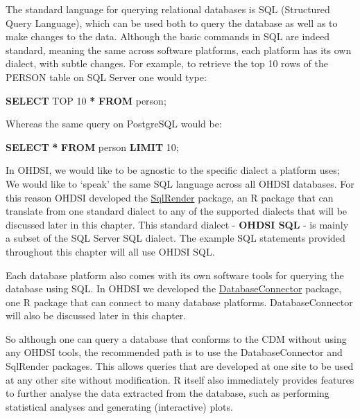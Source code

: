 \documentclass[11pt]{book}
\newenvironment{Shaded}{\begin{snugshade}}{\end{snugshade}}
\newcommand{\DecValTok}[1]{\textcolor[rgb]{0.00,0.00,0.81}{#1}}
\newcommand{\KeywordTok}[1]{\textcolor[rgb]{0.13,0.29,0.53}{\textbf{#1}}}
\newcommand{\NormalTok}[1]{#1}
\newcommand{\OperatorTok}[1]{\textcolor[rgb]{0.81,0.36,0.00}{\textbf{#1}}}
\theoremstyle{definition}
\theoremstyle{definition}
\theoremstyle{definition}
\theoremstyle{remark}
\begin{document}
The standard language for querying relational databases is SQL (Structured Query Language), which can be used both to query the database as well as to make changes to the data. Although the basic commands in SQL are indeed standard, meaning the same across software platforms, each platform has its own dialect, with subtle changes. For example, to retrieve the top 10 rows of the PERSON table on SQL Server one would type:

\begin{Shaded}
\begin{Highlighting}[]
\KeywordTok{SELECT}\NormalTok{ TOP }\DecValTok{10} \OperatorTok{*} \KeywordTok{FROM}\NormalTok{ person;}
\end{Highlighting}
\end{Shaded}

Whereas the same query on PostgreSQL would be:

\begin{Shaded}
\begin{Highlighting}[]
\KeywordTok{SELECT} \OperatorTok{*} \KeywordTok{FROM}\NormalTok{ person }\KeywordTok{LIMIT} \DecValTok{10}\NormalTok{;}
\end{Highlighting}
\end{Shaded}

In OHDSI, we would like to be agnostic to the specific dialect a platform uses; We would like to `speak' the same SQL language across all OHDSI databases. For this reason OHDSI developed the \href{https://ohdsi.github.io/SqlRender/}{SqlRender} package, an R package that can translate from one standard dialect to any of the supported dialects that will be discussed later in this chapter. This standard dialect - \textbf{OHDSI SQL} - is mainly a subset of the SQL Server SQL dialect. The example SQL statements provided throughout this chapter will all use OHDSI SQL.

Each database platform also comes with its own software tools for querying the database using SQL. In OHDSI we developed the \href{https://ohdsi.github.io/DatabaseConnector/}{DatabaseConnector} package, one R package that can connect to many database platforms. DatabaseConnector will also be discussed later in this chapter.

So although one can query a database that conforms to the CDM without using any OHDSI tools, the recommended path is to use the DatabaseConnector and SqlRender packages. This allows queries that are developed at one site to be used at any other site without modification. R itself also immediately provides features to further analyse the data extracted from the database, such as performing statistical analyses and generating (interactive) plots.
\end{document}
